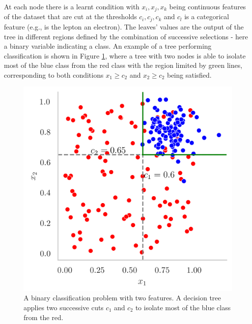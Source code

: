At each node there is a learnt condition with $x_i, x_j, x_k$ being continuous features of the dataset that are cut at the thresholds $c_i, c_j, c_k$ and $c_l$ is a categorical feature (e.g., is the lepton an electron). The leaves' values are the output of the tree in different regions defined by the combination of successive selections - here a binary variable indicating a class. An example of a tree performing classification is shown in Figure \ref{fig:tree-ex}, where a tree with two nodes is able to isolate most of the blue class from the red class with the region limited by green lines, corresponding to both conditions $x_1 \geq c_2$ and $x_2 \geq c_2$ being satisfied.

\begin{figure}[h!]
    \center
    \begin{minipage}[c]{0.3\textwidth}
        \caption{A binary classification problem with two features. A decision tree applies two successive cuts $c_1$ and $c_2$ to isolate most of the blue class from the red.}\label{fig:tree-ex}
      \end{minipage}
      \begin{minipage}[c]{0.5\textwidth}
        \includegraphics[width=\textwidth]{Images/ML/scatterPlot.png}
      \end{minipage}
\end{figure}
    
